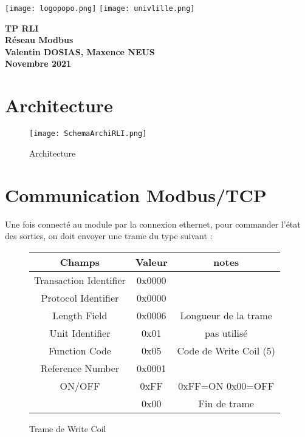 \documentclass[oneside,a4paper,12pt]{article}
\begin{document}
	\begin{titlepage}
		\texttt{[image: logopopo.png]}
		\hspace*{\fill}
		\texttt{[image: univlille.png]}
		
		\begin{center}
			\vspace{1cm}
			\textbf{TP RLI}\\
			\textbf{Réseau Modbus}\\
			\vspace{1cm}
			\textbf{Valentin DOSIAS, Maxence NEUS}\\
			\vspace{3cm}
			\vspace{\fill}
			\textbf{Novembre 2021}\\
		\end{center}
	\end{titlepage}
	
	\tableofcontents
	\newpage
	
	\section{Architecture}
	
	\begin{figure}[h]
		\centering
		\texttt{[image: SchemaArchiRLI.png]}
		\caption{Architecture}
	\end{figure}

	\section{Communication Modbus/TCP}
	
	Une fois connecté au module par la connexion ethernet, pour commander l'état des sorties, on doit envoyer une trame du type suivant :\\
	
	\begin{figure}[h]
		\begin{center}
			\begin{tabular}{|c|c|c|}
				\hline
				Champs & Valeur & notes\\
				\hline
				Transaction Identifier & 0x0000 & \\
				\hline
				Protocol Identifier & 0x0000 & \\
				\hline
				Length Field & 0x0006 & Longueur de la trame\\
				\hline
				Unit Identifier & 0x01 & pas utilisé\\
				\hline
				Function Code & 0x05 & Code de Write Coil (5)\\
				\hline
				Reference Number & 0x0001 &\\
				\hline
				ON/OFF & 0xFF & 0xFF=ON 0x00=OFF\\
				\hline
				& 0x00 & Fin de trame\\
				\hline
			\end{tabular}
		\end{center}
		\caption{Trame de Write Coil}
	\end{figure} 
	
\end{document}

